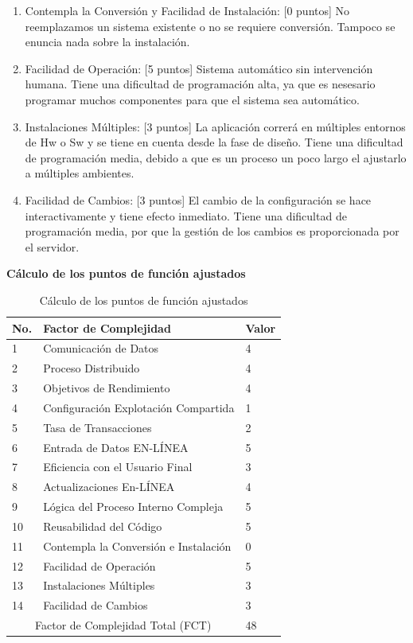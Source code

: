 \documentclass[a4paper,12pt,openany,oneside]{book}
\begin{document}
\begin{enumerate}
	\item Contempla la Conversión y Facilidad de Instalación: [0 puntos] No reemplazamos un sistema existente o no se requiere conversión. Tampoco se enuncia nada sobre la instalación.
	\item Facilidad de Operación: [5 puntos] Sistema automático sin intervención humana. Tiene una dificultad de programación alta, ya que es nesesario programar muchos componentes para que el sistema sea automático.
	\item Instalaciones Múltiples: [3 puntos] La aplicación correrá en múltiples entornos de Hw o Sw y se tiene en cuenta desde la fase de diseño. Tiene una dificultad de programación media, debido a que es un proceso un poco largo el ajustarlo a múltiples ambientes.
	\item Facilidad de Cambios: [3 puntos] El cambio de la configuración se hace interactivamente y tiene efecto inmediato. Tiene una dificultad de programación media, por que la gestión de los cambios es proporcionada por el servidor.
\end{enumerate}
\begin{table}
\textbf{Cálculo de los puntos de función ajustados}\\
\begin{tabular}{| l | l | l |}
\hline
\textbf{No.} & \textbf{Factor de Complejidad} & \textbf{Valor}\\
\hline
1 &  Comunicación de Datos & 4 \\
\hline
2 &  Proceso Distribuido &4  \\
\hline
3 & Objetivos de Rendimiento  &4  \\
\hline
4 & Configuración Explotación Compartida  & 1 \\
\hline
5 & Tasa de Transacciones  & 2 \\
\hline
6 &  Entrada de Datos EN-LÍNEA &  5\\
\hline
7 & Eficiencia con el Usuario Final  &  3\\
\hline
8 & Actualizaciones En-LÍNEA  & 4 \\
\hline
9 & Lógica del Proceso Interno Compleja  &  5\\
\hline
10 & Reusabilidad del Código  &  5\\
\hline
11&  Contempla la Conversión e Instalación &  0\\
\hline
12& Facilidad de Operación  &  5\\
\hline
13& Instalaciones Múltiples  &  3\\
\hline
14& Facilidad de Cambios  & 3 \\
\hline
\multicolumn{2}{|c|}{Factor de Complejidad Total (FCT)} & 48\\
\hline
\end{tabular}
\caption{Cálculo de los puntos de función ajustados}
\end{table}
\end{document}
